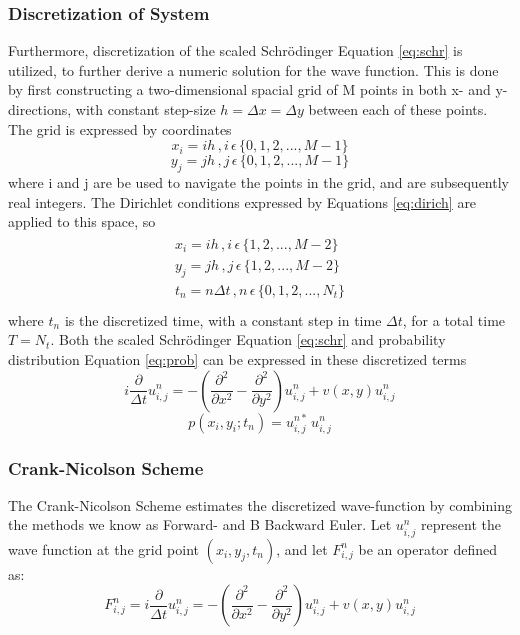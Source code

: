\documentclass[10pt, nofootinbib, twocolumn]{revtex4-1}
\begin{document}
\subsubsection{Discretization of System}
Furthermore, discretization of the scaled Schrödinger Equation \eqref{eq:schr} is utilized, to further derive a numeric solution for the wave function. This is done by first constructing a two-dimensional spacial grid of M points in both x- and y-directions, with constant step-size $h=\Delta x = \Delta y$ between each of these points. The grid is expressed by coordinates
$$x_i=ih \, , i \, \epsilon \, \{0,1,2,...,M-1\} $$
$$y_j=jh \, , j \, \epsilon \, \{0,1,2,...,M-1\} $$
where i and j are be used to navigate the points in the grid, and are subsequently real integers. The Dirichlet conditions expressed by Equations \eqref{eq:dirich} are applied to this space, so 
\begin{align}
    \begin{split}
        x_i=ih \, , i \, \epsilon \, \{1,2,...,M-2\} \\
        y_j=jh \, , j \, \epsilon \, \{1,2,...,M-2\} \\
        t_n = n\Delta t \, , n \, \epsilon \, \{0,1,2,...,N_t\}  \\
    \end{split}
\end{align}
where $t_n$ is the discretized time, with a constant step in time $\Delta t$, for a total time $T=N_t$. Both the scaled Schrödinger Equation \eqref{eq:schr} and probability distribution Equation \eqref{eq:prob} can be expressed in these discretized terms
\begin{equation}\label{eq:schrdis}
    i \frac{\partial}{\Delta t} u^n_{i,j}= -(\frac{\partial^2 }{\partial x^2} - \frac{\partial^2 }{\partial y^2})u^n_{i,j} + v(x,y) u^n_{i,j}
\end{equation}
\begin{equation}\label{eq:probdis}
    p(x_i,y_i;t_n) = u^{n*}_{i,j} \, u^n_{i,j}
\end{equation}

\subsubsection{Crank-Nicolson Scheme}\label{sec:crank}
The Crank-Nicolson Scheme estimates the discretized wave-function by combining the methods we know as Forward- and B Backward Euler. Let \( u_{i,j}^n \) represent the wave function at the grid point \( (x_i, y_j, t_n) \), and let \( F_{i,j}^n \) be an operator defined as:
\begin{equation}\label{eq:probdis}
    F_{i,j}^n = i \frac{\partial}{\Delta t} u^n_{i,j}= -(\frac{\partial^2 }{\partial x^2} - \frac{\partial^2 }{\partial y^2})u^n_{i,j} + v(x,y) u^n_{i,j}
\end{equation}
\end{document}
